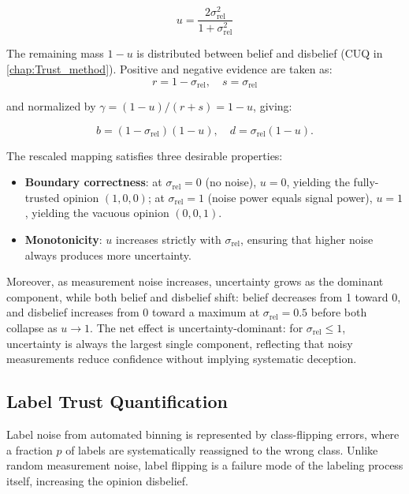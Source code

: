 \begin{equation}
u = \frac{2\sigma_{\text{rel}}^2}{1 + \sigma_{\text{rel}}^2}
\label{eq:feature_u}
\end{equation}

The remaining mass $1 - u$ is distributed between belief and disbelief (\ac{CUQ} in \cref{chap:Trust_method}). Positive and negative evidence are taken as:
\begin{equation}
r = 1 - \sigma_{\text{rel}}, \quad s = \sigma_{\text{rel}}
\end{equation}

and normalized by $\gamma = (1 - u) / (r + s) = 1 - u$, giving:

\begin{equation}
b = (1 - \sigma_{\text{rel}}) (1 - u), \quad d = \sigma_{\text{rel}} (1 - u).
\label{eq:feature_bd}
\end{equation}

The rescaled mapping satisfies three desirable properties:
\begin{itemize}
    \item \textbf{Boundary correctness}: at $\sigma_{\text{rel}} = 0$ (no noise), $u = 0$, yielding the fully-trusted opinion $(1, 0, 0)$; at $\sigma_{\text{rel}} = 1$ (noise power equals signal power), $u = 1$, yielding the vacuous opinion $(0, 0, 1)$.
    \item \textbf{Monotonicity}: $u$ increases strictly with $\sigma_{\text{rel}}$, ensuring that higher noise always produces more uncertainty.
\end{itemize}

Moreover, as measurement noise increases, uncertainty grows as the dominant component, while both belief and disbelief shift: belief decreases from 1 toward 0, and disbelief increases from 0 toward a maximum at $\sigma_{\text{rel}} = 0.5$ before both collapse as $u \to 1$. The net effect is uncertainty-dominant: for $\sigma_{\text{rel}} \leq 1$, uncertainty is always the largest single component, reflecting that noisy measurements reduce confidence without implying systematic deception.




\subsection{Label Trust Quantification}
\label{sec:label_trust_quantification}
Label noise from automated binning is represented by class-flipping errors, where a fraction $p$ of labels are systematically reassigned to the wrong class. Unlike random measurement noise, label flipping is a failure mode of the labeling process itself, increasing the opinion disbelief. 

